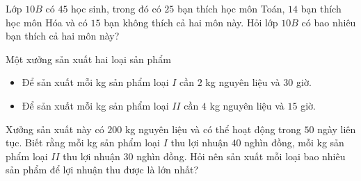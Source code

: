\begin{bt}%
Lớp $ 10B $	 có $ 45$ học sinh, trong đó có $ 25 $ bạn thích học môn Toán, $ 14 $ bạn thích học môn Hóa và có $ 15 $ bạn không thích cả hai môn này. Hỏi lớp $ 10B $ có bao nhiêu bạn thích cả hai môn này?
\end{bt}
\begin{bt}%
	Một xưởng sản xuất hai loại sản phẩm
	\begin{itemize}
		\item Để sản xuất mỗi kg sản phẩm loại $ I $ cần $ 2 $ kg nguyên liệu và $ 30 $ giờ.
		\item Để sản xuất mỗi kg sản phẩm loại $ II $ cần $ 4 $ kg nguyên liệu và $ 15 $ giờ.
	\end{itemize}
Xưởng sản xuất này có $ 200 $ kg nguyên liệu và có thể hoạt động trong $ 50 $ ngày liên tục. Biết rằng mỗi kg sản phẩm loại $ I $ thu lợi nhuận $ 40 $ nghìn đồng, mỗi kg sản phẩm loại $ II $ thu lợi nhuận $ 30 $ nghìn đồng. Hỏi nên sản xuất mỗi loại bao nhiêu sản phẩm để lợi nhuận thu được là lớn nhất?
\end{bt}
